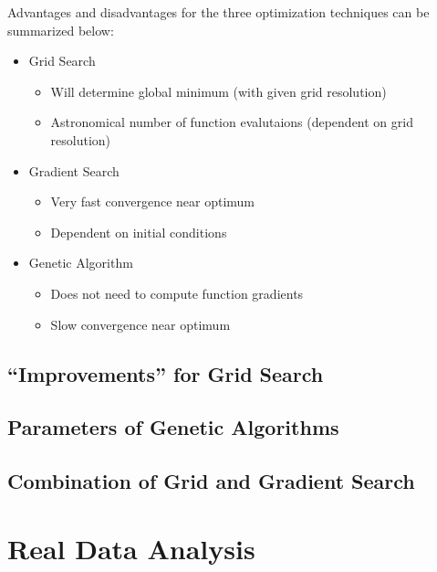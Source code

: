 \documentclass[11pt,a4paper]{article}
\begin{document}
Advantages and disadvantages for the three optimization techniques can be
summarized below:
\begin{itemize}
    \item Grid Search
        \begin{itemize}
            \item Will determine global minimum (with given grid resolution)
            \item Astronomical number of function evalutaions (dependent on
                grid resolution)
        \end{itemize}
    \item Gradient Search
        \begin{itemize}
            \item Very fast convergence near optimum
            \item Dependent on initial conditions
        \end{itemize}
    \item Genetic Algorithm
        \begin{itemize}
            \item Does not need to compute function gradients
            \item Slow convergence near optimum
        \end{itemize}
\end{itemize}

\subsection{``Improvements'' for Grid Search}

\subsection{Parameters of Genetic  Algorithms}

\subsection{Combination of Grid and Gradient Search}

\section{Real Data Analysis}
\end{document}
